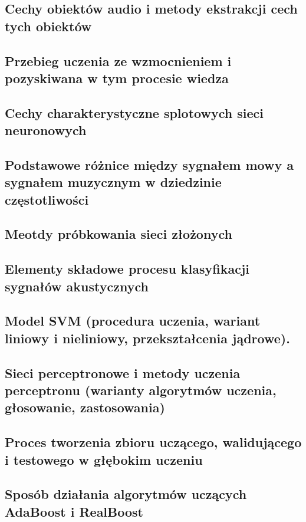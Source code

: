 \documentclass[wi]{zut}
\begin{document}
\subsection{Cechy obiektów audio i metody ekstrakcji cech tych obiektów}

\subsection{Przebieg uczenia ze wzmocnieniem i pozyskiwana w tym procesie wiedza}

\subsection{Cechy charakterystyczne splotowych sieci neuronowych}

\subsection{Podstawowe różnice między sygnałem mowy a sygnałem muzycznym w dziedzinie częstotliwości}

\subsection{Meotdy próbkowania sieci złożonych}

\subsection{Elementy składowe procesu klasyfikacji sygnałów akustycznych}

\subsection{Model SVM (procedura uczenia, wariant liniowy i nieliniowy, przekształcenia jądrowe).}

\subsection{Sieci perceptronowe i metody uczenia perceptronu (warianty algorytmów uczenia, głosowanie, zastosowania)}

\subsection{Proces tworzenia zbioru uczącego, walidującego i testowego w głębokim uczeniu}

\subsection{Sposób działania algorytmów uczących AdaBoost i RealBoost}
\end{document}
